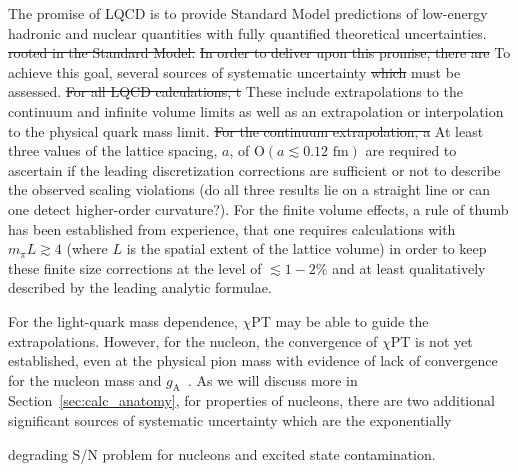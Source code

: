 \documentclass{ar-1col}
\newcommand{\change}[1]{{\color{red} #1}}
\begin{document}
The promise of LQCD is to provide \change{Standard Model} predictions of low-energy hadronic and nuclear quantities with fully quantified theoretical uncertainties. \sout{rooted in the Standard Model.}
\sout{In order to deliver upon this promise, there are }
\change{To achieve this goal,} several sources of systematic uncertainty \sout{which} must be \change{assessed}.
\sout{For all LQCD calculations, t} These include extrapolations to the continuum and infinite volume limits as well as an extrapolation or interpolation to the physical quark mass limit.
\sout{For the continuum extrapolation, a} At least three values of the lattice spacing, $a$, of $\mathrm{O}(a\lesssim0.12\textrm{ fm})$ are required to ascertain if the leading discretization corrections are sufficient or not to describe the observed scaling violations (do all three results lie on a straight line or can one detect higher-order curvature?).
For the finite volume effects, a rule of thumb has been established from experience, that one requires calculations with $m_\pi L \gtrsim4$ (where $L$ is the spatial extent of the lattice volume) in order to keep these finite size corrections at the level of $\lesssim1-2\%$ and at least qualitatively described by the leading analytic formulae.%
\begin{marginnote}
\end{marginnote}%
For the light-quark mass dependence, $\chi$PT may be able to guide the extrapolations.
However, for the nucleon, the convergence of $\chi$PT is not yet established, even at the physical pion mass with evidence of lack of convergence for the nucleon mass and $g_{\mathrm{A}}$~\cite{Chang:2018uxx,Walker-Loud:2019cif}.
As we will discuss more in Section~\ref{sec:calc_anatomy}, for properties of nucleons, there are two additional significant sources of systematic uncertainty which are the exponentially%
\begin{marginnote}
\end{marginnote}%
degrading S/N problem for nucleons and excited state contamination.



\end{document}

